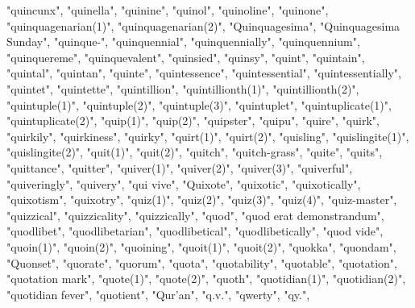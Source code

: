 "quincunx",
"quinella",
"quinine",
"quinol",
"quinoline",
"quinone",
"quinquagenarian(1)",
"quinquagenarian(2)",
"Quinquagesima",
"Quinquagesima Sunday",
"quinque-",
"quinquennial",
"quinquennially",
"quinquennium",
"quinquereme",
"quinquevalent",
"quinsied",
"quinsy",
"quint",
"quintain",
"quintal",
"quintan",
"quinte",
"quintessence",
"quintessential",
"quintessentially",
"quintet",
"quintette",
"quintillion",
"quintillionth(1)",
"quintillionth(2)",
"quintuple(1)",
"quintuple(2)",
"quintuple(3)",
"quintuplet",
"quintuplicate(1)",
"quintuplicate(2)",
"quip(1)",
"quip(2)",
"quipster",
"quipu",
"quire",
"quirk",
"quirkily",
"quirkiness",
"quirky",
"quirt(1)",
"quirt(2)",
"quisling",
"quislingite(1)",
"quislingite(2)",
"quit(1)",
"quit(2)",
"quitch",
"quitch-grass",
"quite",
"quits",
"quittance",
"quitter",
"quiver(1)",
"quiver(2)",
"quiver(3)",
"quiverful",
"quiveringly",
"quivery",
"qui vive",
"Quixote",
"quixotic",
"quixotically",
"quixotism",
"quixotry",
"quiz(1)",
"quiz(2)",
"quiz(3)",
"quiz(4)",
"quiz-master",
"quizzical",
"quizzicality",
"quizzically",
"quod",
"quod erat demonstrandum",
"quodlibet",
"quodlibetarian",
"quodlibetical",
"quodlibetically",
"quod vide",
"quoin(1)",
"quoin(2)",
"quoining",
"quoit(1)",
"quoit(2)",
"quokka",
"quondam",
"Quonset",
"quorate",
"quorum",
"quota",
"quotability",
"quotable",
"quotation",
"quotation mark",
"quote(1)",
"quote(2)",
"quoth",
"quotidian(1)",
"quotidian(2)",
"quotidian fever",
"quotient",
"Qur'an",
"q.v.",
"qwerty",
"qy.",
